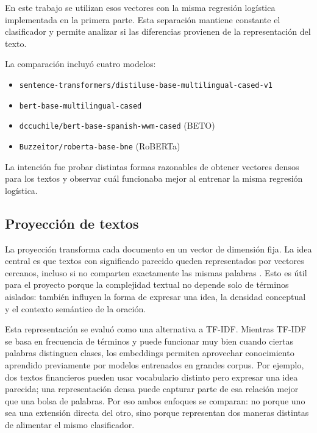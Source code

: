 \documentclass[12pt]{article}
\begin{document}
En este trabajo se utilizan esos vectores con la misma regresión logística implementada en la primera parte. Esta separación mantiene constante el clasificador y permite analizar si las diferencias provienen de la representación del texto.

La comparación incluyó cuatro modelos:\\
\begin{itemize}
\item \texttt{sentence-transformers/distiluse-base-multilingual-cased-v1}\\
\item \texttt{bert-base-multilingual-cased}\\
\item \texttt{dccuchile/bert-base-spanish-wwm-cased} (BETO)\\
\item \texttt{Buzzeitor/roberta-base-bne} (RoBERTa)\\
\end{itemize}

La intención fue probar distintas formas razonables de obtener vectores densos para los textos y observar cuál funcionaba mejor al entrenar la misma regresión logística.

\subsection{Proyección de textos}

La proyección transforma cada documento en un vector de dimensión fija. La idea central es que textos con significado parecido queden representados por vectores cercanos, incluso si no comparten exactamente las mismas palabras \cite{umer2023impact}. Esto es útil para el proyecto porque la complejidad textual no depende solo de términos aislados: también influyen la forma de expresar una idea, la densidad conceptual y el contexto semántico de la oración.

Esta representación se evaluó como una alternativa a TF-IDF. Mientras TF-IDF se basa en frecuencia de términos y puede funcionar muy bien cuando ciertas palabras distinguen clases, los embeddings permiten aprovechar conocimiento aprendido previamente por modelos entrenados en grandes corpus. Por ejemplo, dos textos financieros pueden usar vocabulario distinto pero expresar una idea parecida; una representación densa puede capturar parte de esa relación mejor que una bolsa de palabras. Por eso ambos enfoques se comparan: no porque uno sea una extensión directa del otro, sino porque representan dos maneras distintas de alimentar el mismo clasificador.
\end{document}
